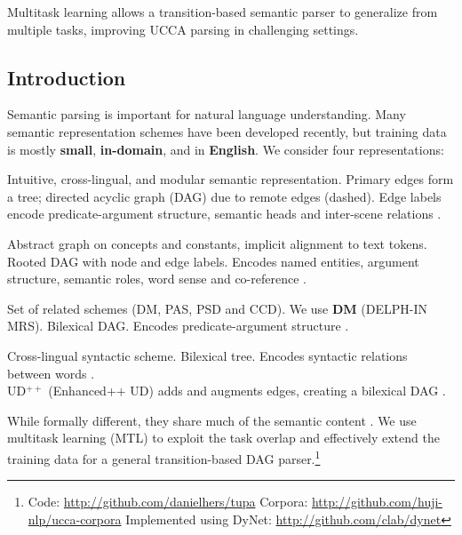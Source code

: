 \documentclass[a0,portrait]{a0poster}
\begin{document}
\vspace{1cm}
\titlespacing*{\section}{0pt}{8mm}{5mm}


\begin{adjustbox}{margin=3mm,frame,minipage=.6\linewidth,center}
\Large\color{Navy}
Multitask learning allows a transition-based semantic parser
to generalize from multiple tasks,
improving UCCA parsing in challenging settings.
\end{adjustbox}


\begin{multicols}{2}


\color{Black}

\section*{Introduction}

Semantic parsing is important for natural language understanding.
Many semantic representation schemes have been developed recently,
but training data is mostly \textbf{small}, \textbf{in-domain}, and in \textbf{English}.
We consider four representations:
\begin{description}[nosep,labelsep=1em]
\item[UCCA.] Intuitive, cross-lingual, and modular semantic representation.
    Primary edges form a tree; directed acyclic graph (DAG) due to remote edges (dashed).
    Edge labels encode predicate-argument structure, semantic heads and inter-scene relations
    \cite{abend2013universal}.
\item[AMR.] Abstract graph on concepts and constants, implicit alignment to text tokens.
    Rooted DAG with node and edge labels.
    Encodes named entities, argument structure, semantic roles, word sense and co-reference
    \cite{banarescu2013abstract}.
\item[SDP.] Set of related schemes (DM, PAS, PSD and CCD). We use \textbf{DM} (DELPH-IN MRS).
    Bilexical DAG.
    Encodes predicate-argument structure
    \cite{oepen2016towards}.
\item[UD.] Cross-lingual syntactic scheme.
    Bilexical tree.
    Encodes syntactic relations between words
    \cite{nivre2016universal}.\\
    UD$^{++}$ (Enhanced++ UD) adds and augments edges, creating a bilexical DAG
    \cite{SCHUSTER16.779}.
\end{description}
While formally different, they share much of the semantic content \cite{abend2017state}.
We use multitask learning (MTL) to exploit the task overlap
and effectively extend the training data
for a general transition-based DAG parser.\footnote{Code:
\url{http://github.com/danielhers/tupa} \hfill
Corpora: \url{http://github.com/huji-nlp/ucca-corpora} \hfill
Implemented using DyNet: \url{http://github.com/clab/dynet}}



\end{multicols}
\end{document}
